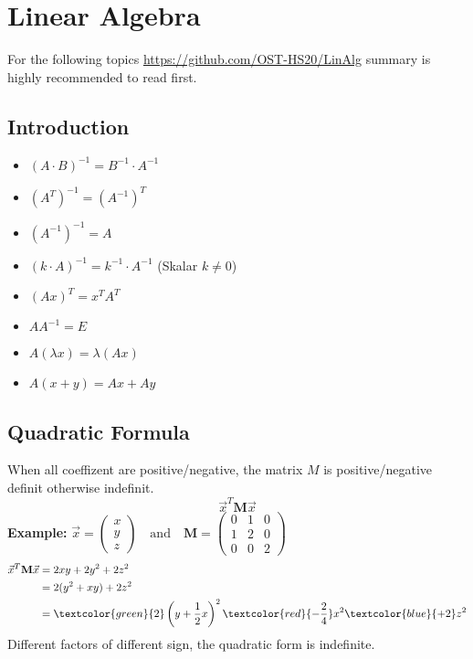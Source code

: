\section{Linear Algebra}
For the following topics \href{https://github.com/OST-HS20/LinAlg}{https://github.com/OST-HS20/LinAlg} summary is highly recommended to read first.

\subsection{Introduction}
\begin{itemize}[nosep]
	\item $(A \cdot B)^{-1} = B^{-1} \cdot A^{-1}$
	\item $(A^T)^{-1} = (A^{-1})^T$
	\item $(A^{-1})^{-1} = A$
	\item $(k \cdot A)^{-1} = k^{-1} \cdot A^{-1}$ (Skalar $k \neq 0$)
	\item $(Ax)^T = x^TA^T$
	\item $AA^{-1} = E$
	\item $A(\lambda x) = \lambda(Ax)$
	\item $A(x + y) = Ax + Ay$
\end{itemize}

\subsection{Quadratic Formula}\label{quadratic}
When all coeffizent are positive/negative, the matrix $M$ is positive/negative definit otherwise indefinit.
\[	\vec{x}^T\mathbf{M}\vec{x} 	\]
\noindent\textbf{Example:}
$
 \vec{x} = \begin{pmatrix}
 	x \\ y \\ z
 \end{pmatrix} \quad \text{and} \quad \mathbf{M} = \begin{pmatrix}
 0 & 1 & 0 \\ 1 & 2 & 0 \\ 0 & 0 & 2
\end{pmatrix}
$
\begin{align*}
	\vec{x}^T\mathbf{M}\vec{x} &= 2xy + 2y^2 + 2z^2 \\
	&= 2(y^2 + xy) + 2z^2 \\
	&= \textcolor{green}{2} \left(y + \frac{1}{2}x\right)^2 \textcolor{red}{- \frac{2}{4}} x^2 \textcolor{blue}{+ 2} z^2
\end{align*}
Different factors of different sign, the quadratic form is indefinite.

